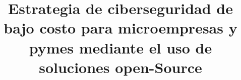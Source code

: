 \documentclass[stu, 12pt, letterpaper, donotrepeattitle, floatsintext, natbib]{apa7}
\title{\Large Estrategia de ciberseguridad de bajo costo para microempresas y pymes mediante el uso de soluciones open-Source}
\begin{document}
\maketitle


\renewcommand\contentsname{\largeÍndice}
\tableofcontents
\setcounter{tocdepth}{2}
\newpage
\renewcommand{\listfigurename}{\largeÍndice de fíguras}
\listoffigures
\newpage
\renewcommand{\listtablename}{\largeÍndice de tablas}
\listoftables
\newpage






\newpage
\renewcommand\refname{\large\textbf{Referencias}}

\end{document}

